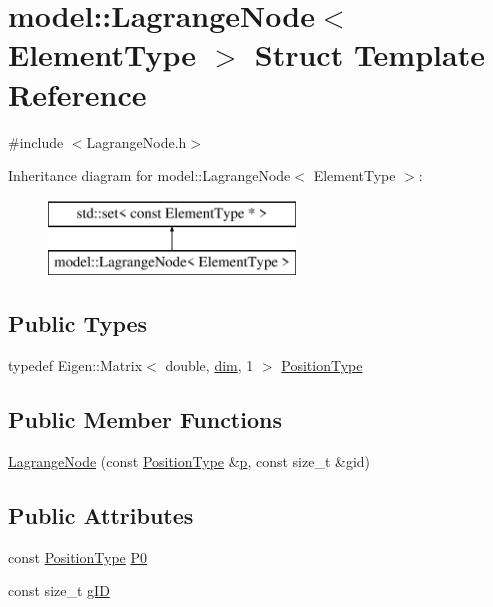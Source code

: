 \hypertarget{structmodel_1_1_lagrange_node}{}\section{model\+:\+:Lagrange\+Node$<$ Element\+Type $>$ Struct Template Reference}
\label{structmodel_1_1_lagrange_node}


{\ttfamily \#include $<$Lagrange\+Node.\+h$>$}

Inheritance diagram for model\+:\+:Lagrange\+Node$<$ Element\+Type $>$\+:\begin{figure}[H]
\begin{center}
\leavevmode
\includegraphics[height=2.000000cm]{structmodel_1_1_lagrange_node}
\end{center}
\end{figure}
\subsection*{Public Types}
\begin{DoxyCompactItemize}
\item 
typedef Eigen\+::\+Matrix$<$ double, \hyperlink{structmodel_1_1_lagrange_node_ac81c9fed45284ea37402810157ee82d3}{dim}, 1 $>$ \hyperlink{structmodel_1_1_lagrange_node_ab10f4c4ce2d9ceba42ceae31c4a0b7e8}{Position\+Type}
\end{DoxyCompactItemize}
\subsection*{Public Member Functions}
\begin{DoxyCompactItemize}
\item 
\hyperlink{structmodel_1_1_lagrange_node_a61edc8f3da49123b8a0e1e23bcc88b08}{Lagrange\+Node} (const \hyperlink{structmodel_1_1_lagrange_node_ab10f4c4ce2d9ceba42ceae31c4a0b7e8}{Position\+Type} \&\hyperlink{plot_cells_8m_ac483f6ce851c9ecd9fb835ff7551737c}{p}, const size\+\_\+t \&gid)
\end{DoxyCompactItemize}
\subsection*{Public Attributes}
\begin{DoxyCompactItemize}
\item 
const \hyperlink{structmodel_1_1_lagrange_node_ab10f4c4ce2d9ceba42ceae31c4a0b7e8}{Position\+Type} \hyperlink{structmodel_1_1_lagrange_node_a7bc278747778ccac328ea854fb85bf31}{P0}
\item 
const size\+\_\+t \hyperlink{structmodel_1_1_lagrange_node_a1db90ee5da5786c61540140208648e14}{g\+I\+D}
\end{DoxyCompactItemize}
